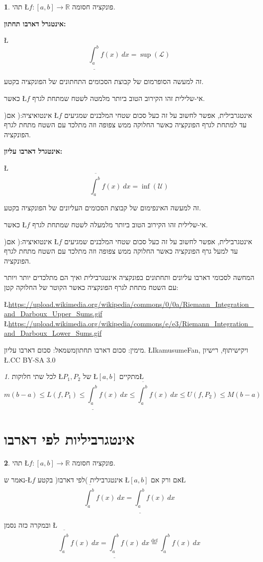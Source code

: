 \documentclass[english,hebrew]{article}
\theoremstyle{remark}
\theoremstyle{definition}
\newtheorem*{defn*}{\protect\definitionname}
\theoremstyle{plain}
\theoremstyle{remark}
\newtheorem{claim}[thm]{\protect\claimname}
\theoremstyle{plain}
\theoremstyle{plain}
\theoremstyle{definition}
\theoremstyle{plain}
\providecommand{\claimname}{טענה}
\providecommand{\definitionname}{הגדרה}
\begin{document}
\begin{defn*}
תהי \L{$f:\left[a,b\right]\rightarrow\mathbb{R}$} פונקציה חסומה.

\textbf{אינטגרל דארבו תחתון:}

\L{%
\[
\underline{\int_{a}^{b}}f(x)\ dx=\sup\left(\mathcal{L}\right)
\]
}%

זה למעשה הסופרמום של קבוצת הסכומים התחתונים של הפונקציה בקטע.

כאשר \L{$f$} אי-שלילית זהו הקירוב הטוב ביותר מלמטה לשטח שמתחת לגרף.

)אינטואיציה:( אם \L{$f$} אינטגרבילית, אפשר לחשוב על זה כעל סכום שטחי
המלבנים שמגיעים עד למתחת לגרף הפונקציה כאשר החלוקה ממש צפופה וזה מתלכד
עם השטח מתחת לגרף הפונקציה.

\textbf{אינטגרל דארבו עליון:}

\L{%
\[
\overline{\int_{a}^{b}}f(x)\ dx=\inf\left(\mathcal{U}\right)
\]
}%

זה למעשה האינפימום של קבוצת הסכומים העליונים של הפונקציה בקטע.

כאשר \L{$f$} אי-שלילית זהו הקירוב הטוב ביותר מלמעלה לשטח שמתחת לגרף.

)אינטואיציה:( אם \L{$f$} אינטגרבילית, אפשר לחשוב על זה כעל סכום שטחי
המלבנים שמגיעים עד למעל גרף הפונקציה כאשר החלוקה ממש צפופה וזה מתלכד
עם השטח מתחת לגרף הפונקציה.
\end{defn*}
המחשה לסכומי דארבו עליונים ותחתונים בפונקציה אינטגרבילית ואיך הם מתלכדים
יותר ויותר עם השטח מתחת לגרף הפונקציה כאשר הקוטר של החלוקה קטן:
\begin{center}
\L{\url{https://upload.wikimedia.org/wikipedia/commons/0/0a/Riemann_Integration_and_Darboux_Upper_Sums.gif}}
\L{\url{https://upload.wikimedia.org/wikipedia/commons/e/e3/Riemann_Integration_and_Darboux_Lower_Sums.gif}}
\par\end{center}

מימין: סכום דארבו תחתון\qquad{}משמאל: סכום דארבו עליון. \L{IkamusumeFan},
ויקישיתוף, רישיון \L{.CC BY-SA 3.0}
\begin{claim}
לכל שתי חלוקות \L{$P_{1},P_{2}$} של \L{$\left[a,b\right]$} מתקיים\L{%
\[
m\left(b-a\right)\le L\left(f,P_{1}\right)\le\underline{\int_{a}^{b}}f(x)\ dx\le\overline{\int_{a}^{b}}f(x)\ dx\le U\left(f,P_{2}\right)\le M\left(b-a\right)
\]
}%
\end{claim}

\section{אינטגרביליות לפי דארבו}
\begin{defn*}
תהי \L{$f:\left[a,b\right]\rightarrow\mathbb{R}$} פונקציה חסומה.

נאמר ש-\L{$f$} אינטגרבילית )לפי דארבו( בקטע \L{$\left[a,b\right]$}
אם ורק אם\L{%
\[
\overline{\int_{a}^{b}}f(x)\ dx=\underline{\int_{a}^{b}}f(x)\ dx
\]
}%

ובמקרה כזה נסמן \L{%
\[
\overline{\int_{a}^{b}}f(x)\ dx=\underline{\int_{a}^{b}}f(x)\ dx\overset{\text{def}}{=}\int_{a}^{b}f(x)\ dx
\]
}%
\end{defn*}
\end{document}
